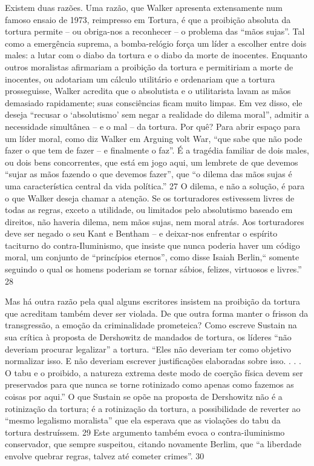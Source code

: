 Existem duas razões. Uma razão, que Walker apresenta extensamente num famoso ensaio de 1973, reimpresso em Tortura, é que a proibição absoluta da tortura permite – ou obriga-nos a reconhecer – o problema das “mãos sujas”. Tal como a emergência suprema, a bomba-relógio força um líder a escolher entre dois males: a lutar com o diabo da tortura e o diabo da morte de inocentes. Enquanto outros moralistas afirmariam a proibição da tortura e permitiriam a morte de inocentes, ou adotariam um cálculo utilitário e ordenariam que a tortura prosseguisse, Walker acredita que o absolutista e o utilitarista lavam as mãos demasiado rapidamente; suas consciências ficam muito limpas. Em vez disso, ele deseja “recusar o ‘absolutismo’ sem negar a realidade do dilema moral”, admitir a necessidade simultânea – e o mal – da tortura. Por quê? Para abrir espaço para um líder moral, como diz Walker em Arguing volt War, “que sabe que não pode fazer o que tem de fazer – e finalmente o faz”. É a tragédia familiar de dois males, ou dois bens concorrentes, que está em jogo aqui, um lembrete de que devemos “sujar as mãos fazendo o que devemos fazer”, que “o dilema das mãos sujas é uma característica central da vida política.”
 {\color{blue} 27}  
O dilema, e não a solução, é para o que Walker deseja chamar a atenção. Se os torturadores estivessem livres de todas as regras, exceto a utilidade, ou limitados pelo absolutismo baseado em direitos, não haveria dilema, nem mãos sujas, nem moral atrás. Aos torturadores deve ser negado o seu Kant e Bentham – e deixar-nos enfrentar o espírito taciturno do contra-Iluminismo, que insiste que nunca poderia haver um código moral, um conjunto de “princípios eternos”, como disse Isaiah Berlin,“ somente seguindo o qual os homens poderiam se tornar sábios, felizes, virtuosos e livres.”
 {\color{blue} 28}  

 
\par
 
Mas há outra razão pela qual alguns escritores insistem na proibição da tortura que acreditam também dever ser violada. De que outra forma manter o frisson da transgressão, a emoção da criminalidade prometeica? Como escreve Sustain na sua crítica à proposta de Dershowitz de mandados de tortura, os líderes “não deveriam procurar legalizar” a tortura. “Eles não deveriam ter como objetivo normalizar isso. E não deveriam escrever justificações elaboradas sobre isso. . . . O tabu e o proibido, a natureza extrema deste modo de coerção física devem ser preservados para que nunca se torne rotinizado como apenas como fazemos as coisas por aqui.” O que Sustain se opõe na proposta de Dershowitz não é a rotinização da tortura; é a rotinização da tortura, a possibilidade de reverter ao “mesmo legalismo moralista” que ela esperava que as violações do tabu da tortura destruíssem.
 {\color{blue} 29}  
Este argumento também evoca o contra-iluminismo conservador, que sempre suspeitou, citando novamente Berlim, que “a liberdade envolve quebrar regras, talvez até cometer crimes”.
 {\color{blue} 30}  

